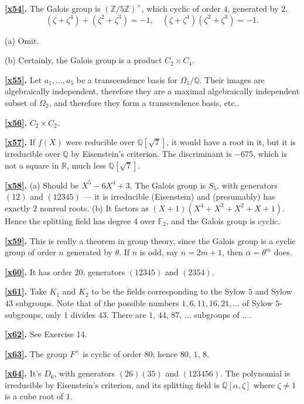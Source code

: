 \documentclass[a4paper,11pt,final,openany]{memoir}
\theoremstyle{nonumberplain}
\begin{document}
\medskip\noindent\textbf{\ref{x54}.} The Galois group is $(\mathbb{Z}%
/5\mathbb{Z})^{\times}$, which cyclic of order $4$, generated by $2$.
\[
(\zeta+\zeta^{4})+(\zeta^{2}+\zeta^{3})=-1,\quad(\zeta+\zeta^{4})(\zeta
^{2}+\zeta^{3})=-1.
\]


(a) Omit.

(b) Certainly, the Galois group is a product $C_{2}\times C_{4}$.

\medskip\noindent\textbf{\ref{x55}.} Let $a_{1},\ldots,a_{5}$ be a
transcendence basis for $\Omega_{1}/{\mathbb{Q}}$. Their images are
algebraically independent, therefore they are a maximal algebraically
independent subset of $\Omega_{2}$, and therefore they form a transcendence
basis, etc..

\medskip\noindent\textbf{\ref{x56}.} $C_{2}\times C_{2}$.

\medskip\noindent\textbf{\ref{x57}.} If $f(X)$ were reducible over
${\mathbb{Q}}[\sqrt{7}]$, it would have a root in it, but it is irreducible
over ${\mathbb{Q}}$ by Eisenstein's criterion. The discriminant is $-675$,
which is not a square in $\mathbb{R}$, much less ${\mathbb{Q}}[\sqrt{7}]$.

\medskip\noindent\textbf{\ref{x58}.} (a) Should be $X^{5}-6X^{4}+3$. The
Galois group is $S_{5}$, with generators $(12)$ and $(12345)$ --- it is
irreducible (Eisenstein) and (presumably) has exactly $2$ nonreal roots. (b)
It factors as $(X+1)(X^{4}+X^{3}+X^{2}+X+1)$. Hence the splitting field has
degree $4$ over $\mathbb{F}_{2}$, and the Galois group is cyclic.

\medskip\noindent\textbf{\ref{x59}.} This is really a theorem in group theory,
since the Galois group is a cyclic group of order $n$ generated by $\theta$.
If $n$ is odd, say $n=2m+1$, then $\alpha=\theta^{m}$ does.

\medskip\noindent\textbf{\ref{x60}.} It has order $20$, generators $(12345)$
and $(2354)$.

\medskip\noindent\textbf{\ref{x61}.} Take $K_{1}$ and $K_{2}$ to be the fields
corresponding to the Sylow $5$ and Sylow $43$ subgroups. Note that of the
possible numbers $1,6,11,16,21,...$ of Sylow $5$-subgroups, only $1$ divides
$43$. There are $1$, $44$, $87$, ... subgroups of ....

\medskip\noindent\textbf{\ref{x62}.} See Exercise 14.

\medskip\noindent\textbf{\ref{x63}.} The group $F^{\times}$ is cyclic of order
$80$; hence $80$, $1$, $8$.

\medskip\noindent\textbf{\ref{x64}.} It's $D_{6}$, with generators $(26)(35)$
and $(123456)$. The polynomial is irreducible by Eisenstein's criterion, and
its splitting field is ${\mathbb{Q}}[\alpha,\zeta]$ where $\zeta\neq1$ is a
cube root of $1$.
\end{document}
